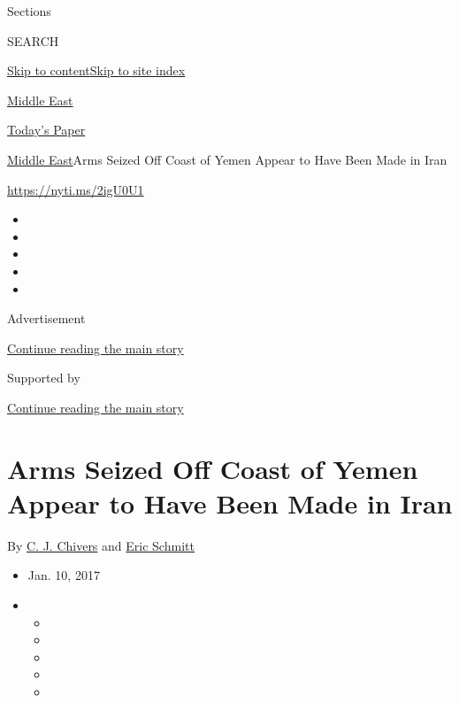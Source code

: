 Sections

SEARCH

\protect\hyperlink{site-content}{Skip to
content}\protect\hyperlink{site-index}{Skip to site index}

\href{https://www.nytimes3xbfgragh.onion/section/world/middleeast}{Middle
East}

\href{https://myaccount.nytimes3xbfgragh.onion/auth/login?response_type=cookie\&client_id=vi}{}

\href{https://www.nytimes3xbfgragh.onion/section/todayspaper}{Today's
Paper}

\href{/section/world/middleeast}{Middle East}\textbar{}Arms Seized Off
Coast of Yemen Appear to Have Been Made in Iran

\url{https://nyti.ms/2igU0U1}

\begin{itemize}
\item
\item
\item
\item
\item
\end{itemize}

Advertisement

\protect\hyperlink{after-top}{Continue reading the main story}

Supported by

\protect\hyperlink{after-sponsor}{Continue reading the main story}

\hypertarget{arms-seized-off-coast-of-yemen-appear-to-have-been-made-in-iran}{%
\section{Arms Seized Off Coast of Yemen Appear to Have Been Made in
Iran}\label{arms-seized-off-coast-of-yemen-appear-to-have-been-made-in-iran}}

By \href{http://www.nytimes3xbfgragh.onion/by/c-j-chivers}{C. J.
Chivers} and
\href{http://www.nytimes3xbfgragh.onion/by/eric-schmitt}{Eric Schmitt}

\begin{itemize}
\item
  Jan. 10, 2017
\item
  \begin{itemize}
  \item
  \item
  \item
  \item
  \item
  \end{itemize}
\end{itemize}

